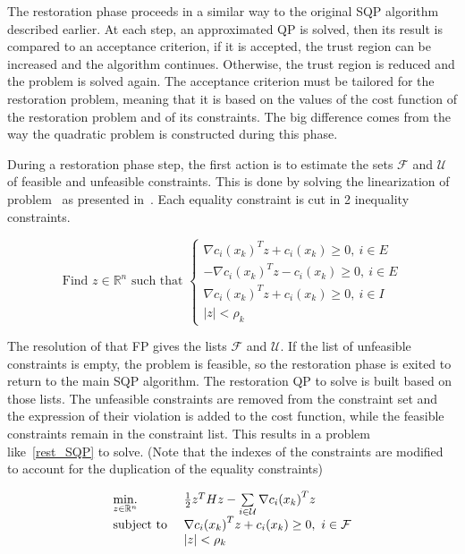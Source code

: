 The restoration phase proceeds in a similar way to the original SQP algorithm described earlier.
At each step, an approximated QP is solved, then its result is compared to an acceptance criterion, if it is accepted, the trust region can be increased and the algorithm continues.
Otherwise, the trust region is reduced and the problem is solved again.
The acceptance criterion must be tailored for the restoration problem, meaning that it is based on the values of the cost function of the restoration problem and of its constraints.
The big difference comes from the way the quadratic problem is constructed during this phase.

During a restoration phase step, the first action is to estimate the sets $\mathcal{F}$ and $\mathcal{U}$ of feasible  and unfeasible constraints.
This is done by solving the linearization of problem~ as presented in~.
Each equality constraint is cut in 2 inequality constraints.

\begin{equation}
  \text{Find $z\in\mathbb{R}^n$ such that }
  \left\{
  \begin{array}{l}
    {\nabla c_i(x_k)}^T z+c_i(x_k)\geq 0,\ i\in E \\
    -{\nabla c_i(x_k)}^T z-c_i(x_k)\geq 0,\ i\in E \\
    {\nabla c_i(x_k)}^T z+c_i(x_k)\geq 0,\ i\in I\\
    |z|<\rho_k
  \end{array}
  \right.
\label{eq:FP}
\end{equation}

The resolution of that FP gives the lists $\mathcal{F}$ and $\mathcal{U}$.
If the list of unfeasible constraints is empty, the problem is feasible, so the restoration phase is exited to return to the main SQP algorithm.
The restoration QP to solve is built based on those lists.
The unfeasible constraints are removed from the constraint set and the expression of their violation is added to the cost function, while the feasible constraints remain in the constraint list.
This results in a problem like~\ref{rest_SQP} to solve.
(Note that the indexes of the constraints are modified to account for the duplication of the equality constraints)

\begin{equation}
  \begin{array}{ll}
    \operatorname*{min.}\limits_{z\in \mathbb{R}^n}{} & \frac{1}{2} z^T Hz - \sum\limits_{i\in\mathcal{U}}{\nabla c_i(x_k)}^T z \\
    \text{subject to } & {\nabla c_i(x_k)}^T z+c_i(x_k)\geq 0,\ i \in \mathcal{F} \\
                       & |z|<\rho_k
  \end{array}
\label{rest_SQP}
\end{equation}

